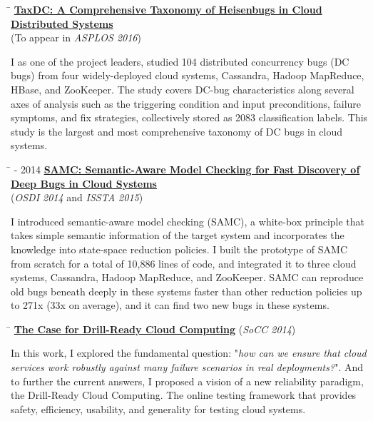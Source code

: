 \documentclass[10pt]{article} %
\begin{document}
\begin{tabbing}
\hspace{2.5cm} \=  \> \href{http://ucare.cs.uchicago.edu/pdf/asplos16-TaxDC.pdf}{\textbf{TaxDC: A Comprehensive Taxonomy of Heisenbugs in Cloud Distributed Systems}} \\
\>\+ (To appear in \textit{ASPLOS 2016}) \\
\begin{minipage}{\smallertextwidth}
I as one of the project leaders, studied 104 distributed concurrency bugs (DC
bugs) from four widely-deployed cloud systems, Cassandra, Hadoop MapReduce,
HBase, and ZooKeeper. The study covers DC-bug characteristics along several axes
of analysis such as the triggering condition and input preconditions, failure
symptoms, and fix strategies, collectively stored as 2083 classification labels.
This study is the largest and most comprehensive taxonomy of DC bugs in cloud
systems.
\end{minipage}
\end{tabbing}

\begin{tabbing}
\hspace{2.5cm} \=  - 2014 \> \href{http://ucare.cs.uchicago.edu/pdf/osdi14-samc.pdf}{\textbf{SAMC: Semantic-Aware Model Checking for Fast Discovery of Deep Bugs in Cloud Systems}} \\
\>\+ (\textit{OSDI 2014} and \textit{ISSTA 2015}) \\
\begin{minipage}{\smallertextwidth}
I introduced semantic-aware model checking (SAMC), a white-box principle that
takes simple semantic information of the target system and incorporates the
knowledge into state-space reduction policies. I built the prototype of SAMC
from scratch for a total of 10,886 lines of code, and integrated it to three
cloud systems, Cassandra, Hadoop MapReduce, and ZooKeeper. SAMC can reproduce
old bugs beneath deeply in these systems faster than other reduction policies up
to 271x (33x on average), and it can find two new bugs in these systems.
\end{minipage}
\end{tabbing}

\begin{tabbing}
\hspace{2.5cm} \=  \>\+ \href{http://ucare.cs.uchicago.edu/pdf/socc14-drill.pdf}{\textbf{The Case for Drill-Ready Cloud Computing}} (\textit{SoCC 2014}) \\
\begin{minipage}{\smallertextwidth}
In this work, I explored the fundamental question: "\textit{how can we ensure
that cloud services work robustly against many failure scenarios in real
deployments?}". And to further the current answers, I proposed a vision of a new
reliability paradigm, the Drill-Ready Cloud Computing. The online testing
framework that provides safety, efficiency, usability, and generality for
testing cloud systems.
\end{minipage}
\end{tabbing}
\end{document}
